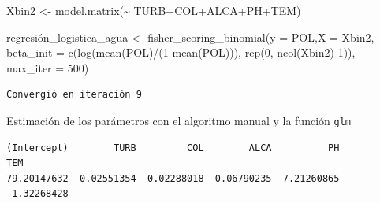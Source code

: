 \documentclass[
  letterpaper,
  DIV=11,
  numbers=noendperiod]{scrartcl}
\newenvironment{Shaded}{\begin{snugshade}}{\end{snugshade}}
\newcommand{\AttributeTok}[1]{\textcolor[rgb]{0.40,0.45,0.13}{#1}}
\newcommand{\DecValTok}[1]{\textcolor[rgb]{0.68,0.00,0.00}{#1}}
\newcommand{\FunctionTok}[1]{\textcolor[rgb]{0.28,0.35,0.67}{#1}}
\newcommand{\NormalTok}[1]{\textcolor[rgb]{0.00,0.23,0.31}{#1}}
\newcommand{\OtherTok}[1]{\textcolor[rgb]{0.00,0.23,0.31}{#1}}
\newcommand{\SpecialCharTok}[1]{\textcolor[rgb]{0.37,0.37,0.37}{#1}}
\newcommand{\StringTok}[1]{\textcolor[rgb]{0.13,0.47,0.30}{#1}}
\begin{document}
\begin{Shaded}
\begin{Highlighting}[]
\NormalTok{Xbin2 }\OtherTok{\textless{}{-}} \FunctionTok{model.matrix}\NormalTok{(}\SpecialCharTok{\textasciitilde{}}\NormalTok{ TURB}\SpecialCharTok{+}\NormalTok{COL}\SpecialCharTok{+}\NormalTok{ALCA}\SpecialCharTok{+}\NormalTok{PH}\SpecialCharTok{+}\NormalTok{TEM)}

\NormalTok{regresión\_logistica\_agua }\OtherTok{\textless{}{-}} \FunctionTok{fisher\_scoring\_binomial}\NormalTok{(}\AttributeTok{y =}\NormalTok{ POL,}\AttributeTok{X =}\NormalTok{ Xbin2, }\AttributeTok{beta\_init =} \FunctionTok{c}\NormalTok{(}\FunctionTok{log}\NormalTok{(}\FunctionTok{mean}\NormalTok{(POL)}\SpecialCharTok{/}\NormalTok{(}\DecValTok{1}\SpecialCharTok{{-}}\FunctionTok{mean}\NormalTok{(POL))), }\FunctionTok{rep}\NormalTok{(}\DecValTok{0}\NormalTok{, }\FunctionTok{ncol}\NormalTok{(Xbin2)}\SpecialCharTok{{-}}\DecValTok{1}\NormalTok{)),}
                        \AttributeTok{max\_iter =} \DecValTok{500}\NormalTok{)}
\end{Highlighting}
\end{Shaded}

\begin{verbatim}
Convergió en iteración 9
\end{verbatim}

\begin{Shaded}
\end{Shaded}

Estimación de los parámetros con el algoritmo manual y la función
\texttt{glm}

\begin{Shaded}
\end{Shaded}

\begin{verbatim}
(Intercept)        TURB         COL        ALCA          PH         TEM 
79.20147632  0.02551354 -0.02288018  0.06790235 -7.21260865 -1.32268428 
\end{verbatim}

\begin{Shaded}
\end{Shaded}
\end{document}
